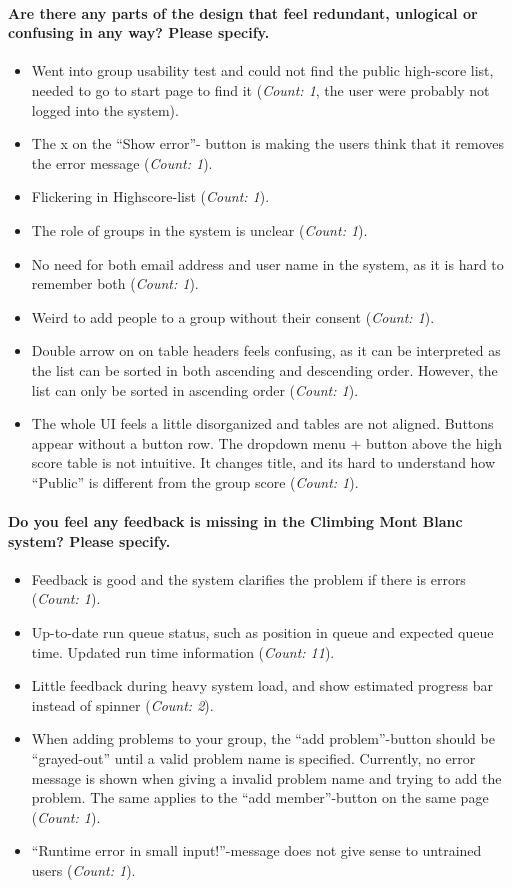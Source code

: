 \paragraph*{Are there any parts of the design that feel redundant, unlogical or confusing in any way? Please specify.}
\begin{itemize}
  \item Went into group usability test and could not find the public high-score list, needed to go to start page to find it (\textit{Count: 1}, the user were probably not logged into the system).
  \item The x on the ``Show error''- button is making the users think that it removes the error message (\textit{Count: 1}).
  \item Flickering in Highscore-list (\textit{Count: 1}).
  \item The role of groups in the system is unclear (\textit{Count: 1}).
  \item No need for both email address and user name in the system, as it is hard to remember both (\textit{Count: 1}).
  \item Weird to add people to a group without their consent (\textit{Count: 1}).
  \item Double arrow on on table headers feels confusing, as it can be interpreted as the list can be sorted in both ascending and descending order. However, the list can only be sorted in ascending order (\textit{Count: 1}).
  \item The whole UI feels a little disorganized and tables are not aligned. Buttons appear without a button row. The dropdown menu + button above the high score table is not intuitive. It changes title, and its hard to understand how ``Public'' is different from the group score (\textit{Count: 1}).
\end{itemize}


\paragraph*{Do you feel any feedback is missing in the Climbing Mont Blanc system? Please specify.} \hfill
\begin{itemize}
  \item Feedback is good and the system clarifies the problem if there is errors (\textit{Count: 1}).
  \item Up-to-date run queue status, such as position in queue and expected queue time. Updated run time information (\textit{Count: 11}).
  \item Little feedback during heavy system load, and show estimated progress bar instead of spinner (\textit{Count: 2}).
  \item When adding problems to your group, the ``add problem''-button should be ``grayed-out'' until a valid problem name is specified. Currently, no error message is shown when giving a invalid problem name and trying to add the problem. The same applies to the ``add member''-button on the same page (\textit{Count: 1}).
  \item ``Runtime error in small input!''-message does not give sense to untrained users (\textit{Count: 1}).
\end{itemize}

